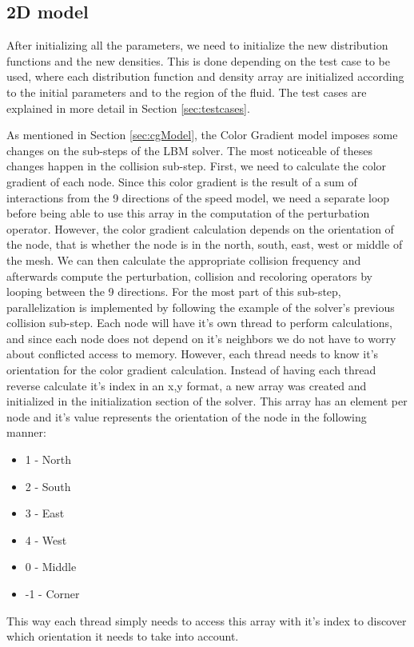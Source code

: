 \documentclass[12pt, openany]{book}
\begin{document}
\subsection{2D model}
After initializing all the parameters, we need to initialize the new distribution functions and the new densities. This is done depending on the test case to be used, where each distribution function and density array are initialized according to the initial parameters and to the region of the fluid. The test cases are explained in more detail in Section \ref{sec:testcases}. \par
As mentioned in Section \ref{sec:cgModel}, the Color Gradient model imposes some changes on the sub-steps of the LBM solver. The most noticeable of theses changes happen in the collision sub-step. First, we need to calculate the color gradient of each node. Since this color gradient is the result of a sum of interactions from the 9 directions of the speed model, we need a separate loop before being able to use this array in the computation of the perturbation operator. However, the color gradient calculation depends on the orientation of the node, that is whether the node is in the north, south, east, west or middle of the mesh. We can then calculate the appropriate collision frequency and afterwards compute the perturbation, collision and recoloring operators by looping between the 9 directions. For the most part of this sub-step, parallelization is implemented by following the example of the solver's previous collision sub-step. Each node will have it's own thread to perform calculations, and since each node does not depend on it's neighbors we do not have to worry about conflicted access to memory. However, each thread needs to know it's orientation for the color gradient calculation. Instead of having each thread reverse calculate it's index in an x,y format, a new array was created and initialized in the initialization section of the solver. This array has an element per node and it's value represents the orientation of the node in the following manner:
\begin{itemize}
	\item 1 - North
	\item 2 - South 
	\item 3 - East 
	\item 4 - West 
	\item 0 - Middle
	\item -1 - Corner    
\end{itemize}
This way each thread simply needs to access this array with it's index to discover which orientation it needs to take into account. \par
\end{document}
